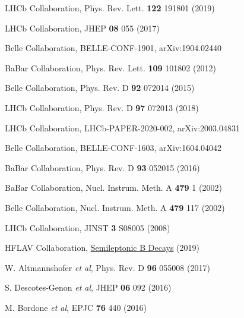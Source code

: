 \documentclass{webofc}
\begin{document}
\begin{thebibliography}{}

LHCb Collaboration, Phys. Rev. Lett. \textbf{122} 191801 (2019)


LHCb Collaboration, JHEP \textbf{08} 055 (2017)

Belle Collaboration, BELLE-CONF-1901, arXiv:1904.02440

BaBar Collaboration, Phys. Rev. Lett. \textbf{109} 101802 (2012)

Belle  Collaboration, Phys. Rev. D \textbf{92} 072014 (2015)

LHCb Collaboration, Phys. Rev. D \textbf{97} 072013 (2018)

LHCb Collaboration, LHCb-PAPER-2020-002, arXiv:2003.04831



Belle Collaboration, BELLE-CONF-1603, arXiv:1604.04042

BaBar Collaboration, Phys. Rev. D \textbf{93} 052015 (2016)

BaBar Collaboration, Nucl. Instrum. Meth. A \textbf{479} 1 (2002)

Belle Collaboration, Nucl. Instrum. Meth. A \textbf{479} 117 (2002)

LHCb Collaboration, JINST \textbf{3} S08005 (2008) 

HFLAV Collaboration,
\href{https://hflav-eos.web.cern.ch/hflav-eos/semi/spring19/main.shtml}{Semileptonic
  B Decays} (2019) 

W. Altmannshofer \textit{et al}, Phys. Rev. D \textbf{96} 055008 (2017)

S. Descotes-Genon \textit{et al}, JHEP \textbf{06} 092 (2016) 

M. Bordone \textit{et al}, EPJC \textbf{76} 440 (2016) 


\end{thebibliography}
\end{document}
